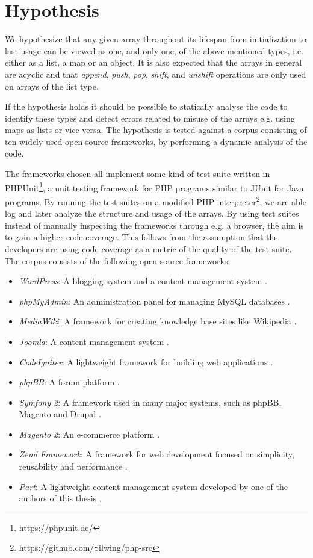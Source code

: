 \section{Hypothesis}
\label{sec:dynhypothesis}
We hypothesize that any given array throughout its lifespan from initialization to last usage can be viewed as one, and only one, of the above mentioned types, i.e. either as a list, a map or an object. It is also expected that the arrays in general are acyclic and that \emph{append}, \textit{push}, \textit{pop}, \textit{shift}, and \textit{unshift} operations are only used on arrays of the list type.

If the hypothesis holds it should be possible to statically analyse the code to identify these types and detect errors related to misuse of the arrays e.g. using maps as lists or vice versa. The hypothesis is tested against a corpus consisting of ten widely used open source frameworks, by performing a dynamic analysis of the code.

The frameworks chosen all implement some kind of test suite written in PHPUnit\footnote{\url{https://phpunit.de/}}, a unit testing framework for PHP programs similar to JUnit for Java programs. By running the test suites on a modified PHP interpreter\footnote{https://github.com/Silwing/php-src}, we are able log and later analyze the structure and usage of the arrays. By using test suites instead of manually inspecting the frameworks through e.g. a browser, the aim is to gain a higher code coverage. This follows from the assumption that the developers are using code coverage as a metric of the quality of the test-suite. The corpus consists of the following open source frameworks:

\begin{itemize}
    \item \emph{WordPress}: A blogging system and a content management system .
    \item \emph{phpMyAdmin}: An administration panel for managing MySQL databases .
    \item \emph{MediaWiki}: A framework for creating knowledge base sites like Wikipedia .
    \item \emph{Joomla}: A content management system .
    \item \emph{CodeIgniter}: A lightweight framework for building web applications .
    \item \emph{phpBB}: A forum platform .
    \item \emph{Symfony 2}: A framework used in many major systems, such as phpBB, Magento and Drupal .
    \item \emph{Magento 2}: An e-commerce platform .
    \item \emph{Zend Framework}: A framework for web development focused on simplicity, reusability and performance .
    \item \emph{Part}: A lightweight content management system developed by one of the authors of this thesis .
\end{itemize}
